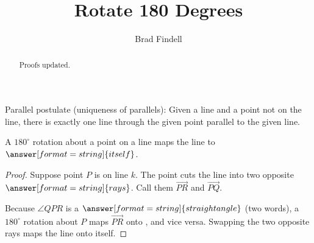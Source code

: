\documentclass[nooutcomes]{ximera}
\title{Rotate 180 Degrees}
\author{Brad Findell}
\begin{document}
\begin{abstract}
Proofs updated. 
\end{abstract}
\maketitle


\begin{axiom}
Parallel postulate (uniqueness of parallels):  Given a line and a point not on the line, there is exactly one line through the given point parallel to the given line.  
\end{axiom}

\begin{theorem}

A $180^\circ$ rotation about a point on a line maps the line to 
$\answer[format=string]{itself}$. 

\begin{problem}
\begin{proof}
Suppose point $P$ is on line $k$.  The point cuts the line into two opposite $\answer[format=string]{rays}$.  Call them $\overrightarrow{PR}$ and $\overrightarrow{PQ}$.  
\begin{image}
\end{image}

Because $\angle QPR$ is a $\answer[format=string]{straight angle}$ (two words), a $180^\circ$ rotation about $P$ maps $\overrightarrow{PR}$ onto , and vice versa.  Swapping the two opposite rays maps the line onto itself.  
\end{proof}
\end{problem}
\end{theorem}
\end{document}
